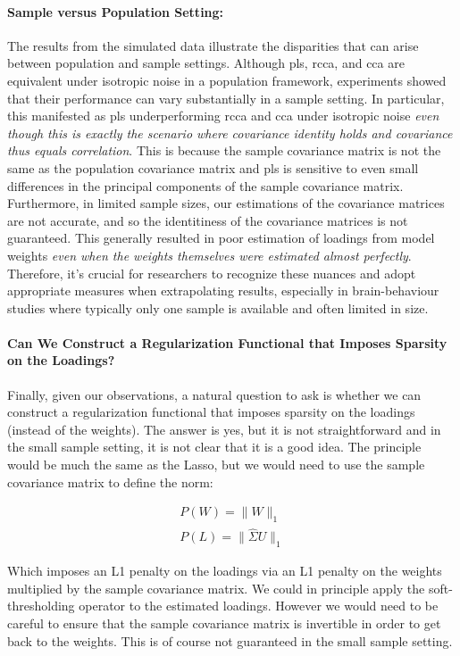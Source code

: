 \paragraph{Sample versus Population Setting:} The results from the simulated data illustrate the disparities that can arise between population and sample settings.
Although \acrshort{pls}, \acrshort{rcca}, and \acrshort{cca} are equivalent under isotropic noise in a population framework, experiments showed that their performance can vary substantially in a sample setting.
In particular, this manifested as \acrshort{pls} underperforming \acrshort{rcca} and \acrshort{cca} under isotropic noise \textit{even though this is exactly the scenario where covariance identity holds and covariance thus equals correlation}.
This is because the sample covariance matrix is not the same as the population covariance matrix and \acrshort{pls} is sensitive to even small differences in the principal components of the sample covariance matrix.
Furthermore, in limited sample sizes, our estimations of the covariance matrices are not accurate, and so the identitiness of the covariance matrices is not guaranteed.
This generally resulted in poor estimation of \gls{loadings} from model \gls{weights} \textit{even when the \gls{weights} themselves were estimated almost perfectly}.
Therefore, it's crucial for researchers to recognize these nuances and adopt appropriate measures when extrapolating results, especially in brain-behaviour studies where typically only one sample is available and often limited in size.


\paragraph{Can We Construct a Regularization Functional that Imposes Sparsity on the Loadings?}
Finally, given our observations, a natural question to ask is whether we can construct a regularization functional that imposes sparsity on the \gls{loadings} (instead of the weights).
The answer is yes, but it is not straightforward and in the small sample setting, it is not clear that it is a good idea.
The principle would be much the same as the Lasso, but we would need to use the sample covariance matrix to define the norm:

\begin{align}
    P(W)=\|W\|_1 \\
    P(L)=\|\hat{\Sigma}U\|_1
\end{align}

Which imposes an L1 penalty on the \gls{loadings} via an L1 penalty on the \gls{weights} multiplied by the sample covariance matrix.
We could in principle apply the soft-thresholding operator to the estimated loadings.
However we would need to be careful to ensure that the sample covariance matrix is invertible in order to get back to the weights.
This is of course not guaranteed in the small sample setting.

